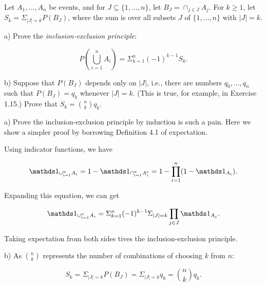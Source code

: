 \begin{exercise}
  Let $A_1,\ldots,A_n$ be events, and for $J\subseteq \{ 1,\ldots,n \}$, let $B_J=\cap_{j\in J}A_j$. For $k\geq 1$, let $S_k=\Sigma_{|J|=k}P(B_J)$, where the sum is over all subsets $J$ of $\{ 1,\ldots,n \}$ with $|J|=k$.

  a) Prove the \textit{inclusion-exclusion principle}:

  \[ P(\bigcup_{i=1}^n A_i) = \Sigma_{k=1}^n (-1)^{k-1}S_k .\]

  b) Suppose that $P(B_J)$ depends only on $|J|$, i.e., there are numbers $q_0,\ldots,q_n$ such that $P(B_J)=q_k$ whenever $|J|=k$. (This is true, for example, in Exercise 1.15.) Prove that $S_k = \binom{n}{k} q_k$.
\end{exercise}
\begin{solution}
  a) Prove the inclusion-exclusion principle by induction is such a pain. Here we show a simpler proof by borrowing Definition 4.1 of expectation.

  Using indicator functions, we have

  \[ \dsone_{\cup_{i=1}^n A_i} = 1 - \dsone_{\cap_{i=1}^n A_i^c} = 1 - \prod_{i=1}^n (1 - \dsone_{A_i}) . \]

  Expanding this equation, we can get

  \[ \dsone_{\cup_{i=1}^n A_i} = \Sigma_{k=1}^n(-1)^{k-1}\Sigma_{|J|=k}\prod_{j\in J}\dsone_{A_j} .\]

  Taking expectation from both sides tives the inclusion-exclusion principle.

  b) As $\binom{n}{k}$ represents the number of combinations of choosing $k$ from $n$:

  \[S_k=\Sigma_{|J|=k}P(B_J) = \Sigma_{|J|=k}q_k = \binom{n}{k}q_k. \]
\end{solution}
